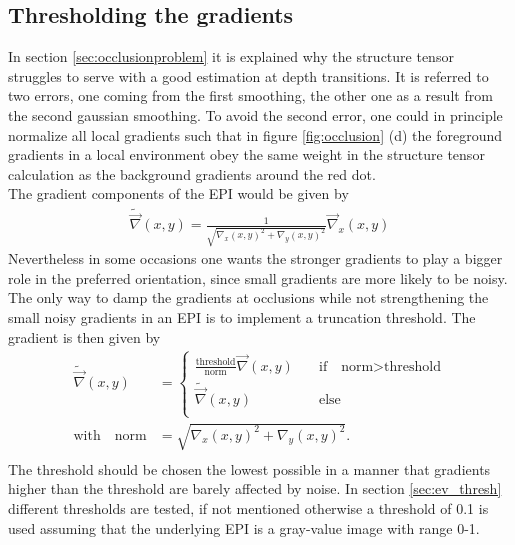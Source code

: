 \documentclass  [
  paper    = a4,
  BCOR     = 10mm,
  twoside,
  fontsize = 12pt,
  fleqn,
  toc      = bibnumbered,
  toc      = listofnumbered,
  numbers  = noendperiod,
  headings = normal,
  listof   = leveldown,
  version  = 3.03
]                                       {scrreprt}
\begin{document}
 \subsection{Thresholding the gradients}
 \label{sec:thresholdinggradients}
 In section \ref{sec:occlusionproblem} it is explained why the structure tensor struggles to serve with a  good estimation at depth transitions. It is referred to two errors, one coming from the first smoothing, the other one as a result from the second gaussian smoothing. To avoid the second error, one could in principle normalize all local gradients such that in figure \ref{fig:occlusion} (d) the foreground gradients in a local environment obey the same weight in the structure tensor calculation as the background gradients around the red dot.\\
 The gradient components of the EPI would be given by
 \begin{align}
 	\tilde{\vec \nabla}(x,y) = \frac{1}{\sqrt{\nabla_x(x,y)^2 + \nabla_y(x,y)^2}} \vec \nabla_x(x,y)
 \end{align}
 Nevertheless in some occasions one wants the stronger gradients to play a bigger role in the preferred orientation, since small gradients are more likely to be noisy. The only way to damp the gradients at occlusions while not strengthening the small noisy gradients in an EPI is to implement a truncation threshold. The gradient is then given by
 \begin{align}
 \tilde{\vec \nabla}(x,y) &= \begin{cases}
\frac{\text{threshold}}{\text{norm}} \vec \nabla(x,y) \quad &\text{if}\quad \text{norm}> \text{threshold}\\
\tilde{\vec \nabla}(x,y)\qquad &\text{else}\\
 \end{cases} \\
\text{with} \quad \text{norm} &= \sqrt{\nabla_x(x,y)^2 + \nabla_y(x,y)^2}.\\
 \end{align}
 The threshold should be chosen the lowest possible in a manner that gradients higher than the threshold are barely affected by noise. In section \ref{sec:ev_thresh} different thresholds are tested, if not mentioned otherwise a threshold of 0.1 is used assuming that the underlying EPI is a gray-value image with range 0-1.\\
 
\end{document}
